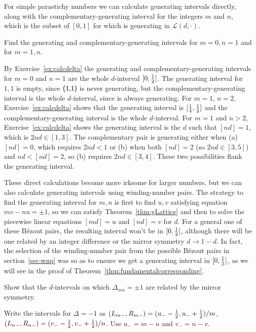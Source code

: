 For simple parastichy numbers we can calculate generating intervals directly, along with the 
complementary-generating interval for the integers $m$ and $n$, which is the subset of  $[0,1]$ for which   is generating in  $\mathcal{L}(d,\cdot)$.
\begin{jExercise}
	Find the generating and complementary-generating intervals for $m=0,n=1$ and for $m=1,n$. 
\end{jExercise}
\begin{jAnswer}
	 By Exercise~\ref{ex:calcdelta} the generating and complementary-generating intervals for $m=0$ and $n=1$ are the whole $d$-interval  $[0,\textstyle{\frac{1}{2}}]$.  
	The generating interval for $1,1$ is empty, since $\textsf{(1,1)}$ is never generating, but the complementary-generating interval is the whole $d$-interval, since  is always generating.
For $m=1$, $n=2$, Exercise~\ref{ex:calcdelta} shows that the generating interval is $[\textstyle{\frac{1}{4}},\textstyle{\frac{1}{2}}]$ and the complementary-generating interval is the whole $d$-interval.
For $m=1$ and $n>2$,  Exercise~\ref{ex:calcdelta} shows the generating interval is the $d$ such that $[nd]=1$, which is $2nd\in [1,3]$.  
The complementary pair is generating either when (a) $[nd]=0$, which requires $2nd<1$ or (b) when both $[nd]=2$ (so $2nd\in [3,5]$) and $nd<[nd]=2$,
so (b) requires $2nd\in[3,4]$. These two possibilities flank the generating interval.
\end{jAnswer}
These direct calculations become more irksome for larger numbers, but we can also calculate generating intervals using winding-number pairs. The strategy to find the generating interval for ${m,n}$ is first to find $u,v$ satisfying equation $mv-nu=\pm 1$, so we can satisfy Theorem~\ref{thm:gLattice} and then to solve the piecewise linear equations $[md]=u$ and $[nd]=v$ for $d$. For a general one of these B\'ezout pairs, the resulting interval won't be in $[0,\textstyle{\frac{1}{2}}]$, although there will be one related by an integer difference or the mirror symmetry $d\rightarrow1-d$. In fact, the selection of the winding-number pair from the possible B\'ezout pairs in section~\ref{sec:wnp} was so as to ensure we get a generating interval in $[0,\textstyle{\frac{1}{2}}]$, as we will see in the proof of Theorem~\ref{thm:fundamentalcorresponding}. 


\begin{jExercise}
	Show that the $d$-intervals on which
	$\Delta_{mn}=\pm1$ are related by the mirror symmetry.
\end{jExercise}
\begin{jAnswer}
	Write the intervals for $\Delta=-1$ as $(L_{m-},R_{m-})= (u_--\textstyle{\frac{1}{2}},u_-+\textstyle{\frac{1}{2}})/m$, $(L_{n-},R_{n-})= (v_--\textstyle{\frac{1}{2}},v_-+\textstyle{\frac{1}{2}})/n$.
	Use $u_-=m-u$ and $v_-=n-v$. 
\end{jAnswer}

